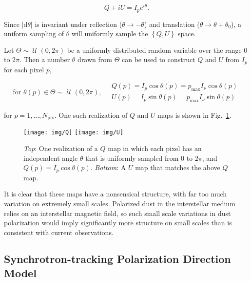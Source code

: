 \documentclass[twoside,10pt]{article}
\DeclareMathOperator{\Uniform}{\mathcal{U}}
\newcommand{\abs}[1]{\lvert#1\rvert}
\newcommand{\pc}[1]{\left\{ #1 \right\} }
\newcommand{\dd}[0]{\mathrm{d}}
\begin{document}
\begin{equation}
    Q + iU = I_p e^{i\theta}.
\end{equation}

Since $\abs{\dd\theta}$ is invariant under reflection
($\theta \to -\theta$) and translation ($\theta \to \theta + \theta_0$), a
uniform sampling of $\theta$ will uniformly sample the $\pc{Q, U}$ space.

Let $\Theta \sim \Uniform{(0, 2\pi)}$ be a uniformly distributed random
variable over the range 0 to $2\pi$. Then a number $\theta$ drawn from
$\Theta$ can be used to construct $Q$ and $U$ from $I_p$ for each pixel $p$,

\begin{equation}
    \text{for } \theta(p) \in \Theta \sim \Uniform{(0, 2\pi)}, \quad
    \begin{array}{l}
        Q(p) = I_p \cos{\theta(p)} = p_\mathrm{max} I_\nu \cos{\theta(p)}\\
        U(p) = I_p \sin{\theta(p)} = p_\mathrm{max} I_\nu \sin{\theta(p)}
    \end{array}
\end{equation}

for $p = 1, \dots, N_\mathrm{pix}$. One such realization of $Q$ and $U$ maps
is shown in Fig.~\ref{fig:QU}.

\begin{figure}[th]
    \begin{center}
        \texttt{[image: img/Q]}
        \texttt{[image: img/U]}
    \end{center}
    \caption{\emph{Top}: One realization of a $Q$ map in which each pixel has
    an independent angle $\theta$ that is uniformly sampled from 0 to $2\pi$,
    and $Q(p) = I_p \cos{\theta(p)}$. \emph{Bottom}: A $U$ map that matches
    the above $Q$ map.}
    \label{fig:QU}
\end{figure}

It is clear that these maps have a nonsensical structure, with far too much
variation on extremely small scales. Polarized dust in the interstellar medium
relies on an interstellar magnetic field\cite{lazarian_tracing_2007}, so such
small scale variations in dust polarization would imply significantly more
structure on small scales than is consistent with current observations.

\subsection{Synchrotron-tracking Polarization Direction Model}
\label{sub:synchrotron_tracking_model}
\end{document}
